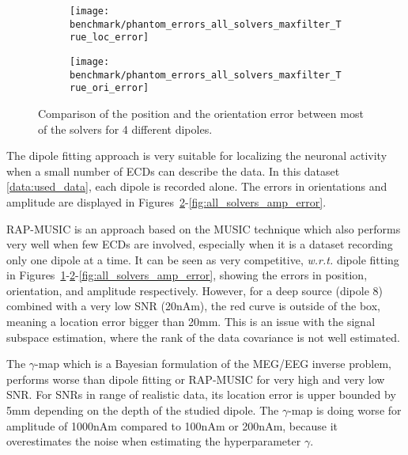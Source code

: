 \begin{sidewaysfigure}[ht]
        \centering
        \begin{subfigure}[b]{0.47\textwidth}
            \centering
            \texttt{[image: benchmark/phantom\_errors\_all\_solvers\_maxfilter\_True\_loc\_error]}
            \caption{\label{fig:all_solvers_loc_error}}
        \end{subfigure}
		\hspace{25pt}
        \begin{subfigure}[b]{0.47\textwidth}  
            \centering 
            \texttt{[image: benchmark/phantom\_errors\_all\_solvers\_maxfilter\_True\_ori\_error]}
            \caption{\label{fig:all_solvers_ori_error}}
        \end{subfigure}

		\caption{Comparison of the position and the orientation error between most of the solvers for 4 different dipoles.\label{all_solvers_loc_error}}
\end{sidewaysfigure}

The dipole fitting approach is very suitable for localizing the neuronal activity when a small number of \ac{ECD}s can describe the data. In this dataset \ref{data:used_data}, each dipole is recorded alone. The errors in orientations and amplitude are displayed in Figures~\ref{fig:all_solvers_ori_error}-\ref{fig:all_solvers_amp_error}.

RAP-MUSIC is an approach based on the MUSIC technique which also performs very well when few ECDs are involved, especially when it is a dataset recording only one dipole at a time. It can be seen as very competitive, \textit{w.r.t.} dipole fitting in Figures~\ref{fig:all_solvers_loc_error}-\ref{fig:all_solvers_ori_error}-\ref{fig:all_solvers_amp_error}, showing the errors in position, orientation, and amplitude respectively. However, for a deep source (dipole 8) combined with a very low SNR (20nAm), the red curve is outside of the box, meaning a location error bigger than 20mm. This is an issue with the signal subspace estimation, where the rank of the data covariance is not well estimated.

The $\gamma$-map which is a Bayesian formulation of the MEG/EEG inverse problem,  performs worse than dipole fitting or RAP-MUSIC for very high and very low SNR. For SNRs in range of realistic data, its location error is upper bounded by 5mm depending on the depth of the studied dipole. The $\gamma$-map is doing worse for amplitude of 1000nAm compared to 100nAm or 200nAm, because it overestimates the noise when estimating the hyperparameter $\gamma$.

